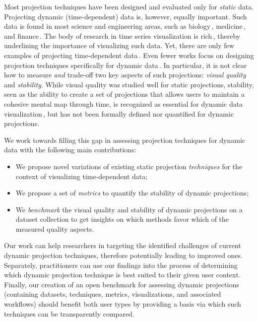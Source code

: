 Most projection techniques have been designed and evaluated only for \emph{static} data. Projecting dynamic (time-dependent) data is, however, equally important. Such data is found in most science and engineering areas, such as biology\,\cite{Teo2017}, medicine\,\cite{GRILLENZONI2019134}, and finance\,\cite{KRAPL2019101506}. The body of research in time series visualization is rich\,\cite{time0}, thereby underlining the importance of visualizing such data. Yet, there are only few examples of projecting time-dependent data\,\cite{Hu2010,Mao2007,Ward2011,Bernard2012,Nguyen2017,Jackle2016}. Even fewer works focus on designing projection techniques specifically for dynamic data\,\cite{Rauber2016,Fujiwara2019}. In particular, it is not clear how to measure \emph{and} trade-off two key aspects of such projections: \emph{visual quality} and \emph{stability}. While visual quality was studied well for static projections, stability, seen as the ability to create a set of projections that allows users to maintain a cohesive mental map through time, is recognized as essential for dynamic data visualization\,\cite{Archambault2011,Brehmer2019ACE}, but has not been formally defined nor quantified for dynamic projections.

We work towards filling this gap in assessing projection techniques for dynamic data with the following main contributions:
\begin{itemize}
  \item We propose novel variations of existing static projection \emph{techniques} for the context of visualizing time-dependent data;
  \item We propose a set of \emph{metrics} to quantify the stability of dynamic projections;
  \item We \emph{benchmark} the visual quality and stability of dynamic projections on a dataset collection to get insights on which methods favor which of the measured quality aspects.
\end{itemize}

Our work can help researchers in targeting the identified challenges of current dynamic projection techniques, therefore potentially leading to improved ones. Separately, practitioners can use our findings into the process of determining which dynamic projection technique is best suited to their given user context. Finally, our creation of an open benchmark for assessing dynamic projections (containing datasets, techniques, metrics, visualizations, and associated workflows) should benefit both user types by providing a basis via which such techniques can be transparently compared.

